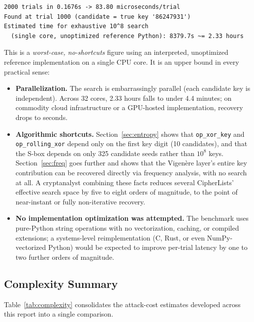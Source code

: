 \documentclass[11pt]{article}
\begin{document}
\begin{lstlisting}
2000 trials in 0.1676s -> 83.80 microseconds/trial
Found at trial 1000 (candidate = true key '86247931')
Estimated time for exhaustive 10^8 search
  (single core, unoptimized reference Python): 8379.7s ~= 2.33 hours
\end{lstlisting}

This is a \emph{worst-case, no-shortcuts} figure using an interpreted,
unoptimized reference implementation on a single CPU core. It is an
upper bound in every practical sense:

\begin{itemize}[leftmargin=1.6em]
\item \textbf{Parallelization.} The search is embarrassingly parallel
(each candidate key is independent). Across 32 cores, 2.33 hours falls
to under 4.4 minutes; on commodity cloud infrastructure or a GPU-hosted
implementation, recovery drops to seconds.
\item \textbf{Algorithmic shortcuts.} Section~\ref{sec:entropy} shows
that \texttt{op\_xor\_key} and \texttt{op\_rolling\_xor} depend only on
the first key digit (10 candidates), and that the S-box depends on only
325 candidate seeds rather than $10^{8}$ keys. Section~\ref{sec:freq}
goes further and shows that the Vigen\`ere layer's entire key
contribution can be recovered directly via frequency analysis, with no
search at all. A cryptanalyst combining these facts reduces several
CipherLists' effective search space by five to eight orders of
magnitude, to the point of near-instant or fully non-iterative recovery.
\item \textbf{No implementation optimization was attempted.} The
benchmark uses pure-Python string operations with no vectorization,
caching, or compiled extensions; a systems-level reimplementation (C,
Rust, or even NumPy-vectorized Python) would be expected to improve
per-trial latency by one to two further orders of magnitude.
\end{itemize}

\subsection{Complexity Summary}

Table~\ref{tab:complexity} consolidates the attack-cost estimates
developed across this report into a single comparison.
\end{document}
